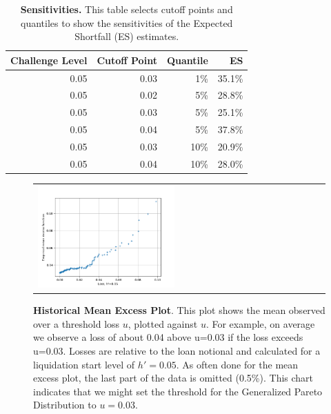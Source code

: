\documentclass[english,11pt]{article}
\begin{document}
\begin{table}[h]
\caption{\textbf{Sensitivities.} 
This table selects cutoff points and quantiles
to show the sensitivities of the Expected Shortfall
(ES) estimates.
\label{tab:sensi}}
\center
\begin{tabular}{rrrr}
\toprule
\textbf{Challenge Level} & \textbf{Cutoff Point} & \textbf{Quantile} & \textbf{ES}   \\
\midrule
0.05 & 0.03 & 1\%  & 35.1\%\\
0.05 & 0.02 & 5\%  & 28.8\%\\
0.05 & 0.03 & 5\%  & 25.1\%\\
0.05 & 0.04 & 5\%  & 37.8\%\\
0.05 & 0.03 & 10\% & 20.9\%\\
0.05 & 0.04 & 10\% & 28.0\%\\
\bottomrule
\end{tabular}
\end{table}

\begin{figure}[h]
    \center
    \begin{tabular}{ll}
    \includegraphics[width=0.5\textwidth]{emp_mean_excess_h05.png}
    \end{tabular}
    \caption{\textbf{Historical Mean Excess Plot}. This plot shows the mean observed
    over a threshold loss $u$, plotted against $u$. For example, on average we
    observe a loss of about 0.04 above u=0.03 if the loss exceeds u=0.03. Losses are relative
    to the loan notional and calculated for a liquidation start level of $h'=0.05$. 
    As often done for the mean excess plot, the last part of
    the data is omitted (0.5\%). This chart indicates that we might set the threshold for the
    Generalized Pareto Distribution to $u=0.03$.
    }\label{fig:hmef}
\end{figure}
\end{document}
